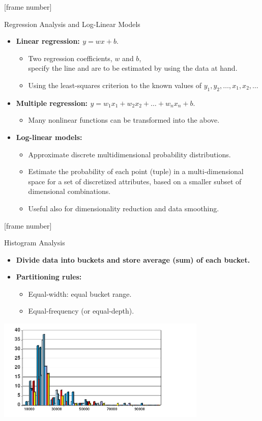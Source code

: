 \documentclass[aspectratio=169,t]{beamer}
\begin{document}
  {
    [frame number]
    \begin{frame}{Regression Analysis and Log-Linear Models}
    \begin{itemize}
      \item \textbf{Linear regression: $y = wx + b$}.
      \begin{itemize}
        \item Two regression coefficients, $w$ and $b$, \\
              specify the line and are to be estimated by using the data at hand.
        \item Using the least-squares criterion to the known values of $y_1,y_2, \ldots, x_1,x_2,\ldots$
      \end{itemize}
      \item \textbf{Multiple regression: $y = w_1 x_1 + w_2 x_2 + \ldots + w_n x_n + b$}.
      \begin{itemize}
        \item Many nonlinear functions can be transformed into the above.
      \end{itemize}
      \item \textbf{Log-linear models:}
      \begin{itemize}
        \item Approximate discrete multidimensional probability distributions.
        \item Estimate the probability of each point (tuple) in a multi-dimensional space for a set of discretized attributes, based on a smaller subset of dimensional combinations.
        \item Useful also for dimensionality reduction and data smoothing.
      \end{itemize}
    \end{itemize}
    \end{frame}
  }

  {
    [frame number]
    \begin{frame}{Histogram Analysis}
    \begin{itemize}
      \item \textbf{Divide data into buckets and store average (sum) of each bucket.}
      \item \textbf{Partitioning rules:}
      \begin{itemize}
        \item Equal-width: equal bucket range.
        \item Equal-frequency (or equal-depth).
      \end{itemize}
    \end{itemize}
    \centering
    \includegraphics[width=10cm]{img/histogram.png}
    \end{frame}
  }
\end{document}
